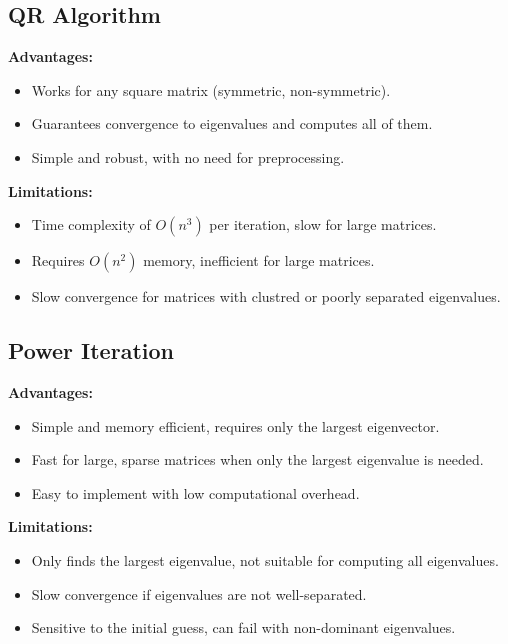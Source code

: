 \documentclass[journal]{IEEEtran}
\begin{document}
\subsection*{QR Algorithm}
\textbf{Advantages:}
\begin{itemize}
    \item Works for any square matrix (symmetric, non-symmetric).
    \item Guarantees convergence to eigenvalues and computes all of them.
    \item Simple and robust, with no need for preprocessing.
\end{itemize}
\textbf{Limitations:}
\begin{itemize}
    \item Time complexity of $O(n^3)$ per iteration, slow for large matrices.
    \item Requires $O(n^2)$ memory, inefficient for large matrices.
    \item Slow convergence for matrices with clustred or poorly separated eigenvalues.
\end{itemize}

\subsection*{Power Iteration}
\textbf{Advantages:}
\begin{itemize}
    \item Simple and memory efficient, requires only the largest eigenvector.
    \item Fast for large, sparse matrices when only the largest eigenvalue is needed.
    \item Easy to implement with low computational overhead.
\end{itemize}
\textbf{Limitations:}
\begin{itemize}
    \item Only finds the largest eigenvalue, not suitable for computing all eigenvalues.
    \item Slow convergence if eigenvalues are not well-separated.
    \item Sensitive to the initial guess, can fail with non-dominant eigenvalues.
\end{itemize}
\end{document}
